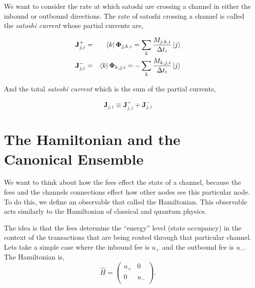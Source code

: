 \documentclass[review,12pt]{elsarticle}
\begin{document}
We want to consider the rate at which satoshi are crossing a channel in either the inbound or outbound directions.
The rate of satoshi crossing a channel is called the \emph{satoshi current} whose partial currents are,
\begin{definition}
  \begin{eqnarray}
    \mathbf{J}_{j,i}^+ & = & \Bra{k}\mathbf{\Phi}_{j,k,i} = \sum_k \frac{M_{j,k,i}}{\Delta t_i}\Ket{j} \nonumber \\
    \mathbf{J}_{j,i}^- & = & \Bra{k}\mathbf{\Phi}_{k,j,i} = -\sum_k \frac{M_{k,j,i}}{\Delta t_i}\Ket{j} \nonumber
  \end{eqnarray}
\end{definition}
And the total \emph{satoshi current} which is the sum of the partial currents,
\begin{definition}
  \begin{equation}
    \mathbf{J}_{j,i} \equiv \mathbf{J}_{j,i}^+ + \mathbf{J}_{j,i}^- \nonumber
  \end{equation}
\end{definition}

\section{The Hamiltonian and the Canonical Ensemble}
We want to think about how the fees effect the state of a channel, because the fees and the channels connections effect how other nodes see this particular node.
To do this, we define an observable that called the Hamiltonian.
This observable acts similarly to the Hamiltonian of classical and quantum physics.

The idea is that the fees determine the ``energy'' level (state occupancy) in the context of the transactions that are being routed through that particular channel.
Lets take a simple case where the inbound fee is $u_+$ and the outbound fee is $u_-$.
The Hamiltonian is,
\begin{equation}
  \hat{H} = \begin{pmatrix}
    u_+ & 0   \\
    0   & u_- \\
  \end{pmatrix}. \nonumber
\end{equation}
\end{document}
